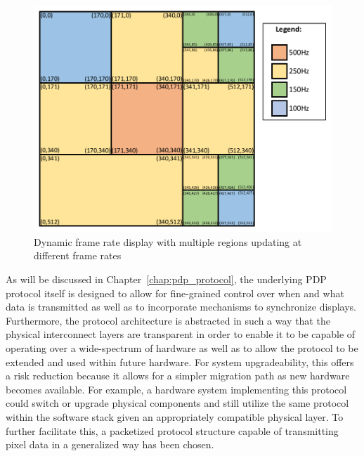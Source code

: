     \begin{figure}
        \centering
        \includegraphics[width=1.0\textwidth]{fig/variable_display.pdf}
        \caption{Dynamic frame rate display with multiple regions updating at different frame rates}
        \label{fig:variable_display}
    \end{figure}

    As will be discussed in Chapter~\ref{chap:pdp_protocol}, the underlying PDP protocol itself is designed to allow for fine-grained control over when and what data is transmitted as well as to incorporate mechanisms to synchronize displays. Furthermore, the protocol architecture is abstracted in such a way that the physical interconnect layers are transparent in order to enable it to be capable of operating over a wide-spectrum of hardware as well as to allow the protocol to be extended and used within future hardware. For system upgradeability, this offers a risk reduction because it allows for a simpler migration path as new hardware becomes available. For example, a hardware system implementing this protocol could switch or upgrade physical components and still utilize the same protocol within the software stack given an appropriately compatible physical layer. To further facilitate this, a packetized protocol structure capable of transmitting pixel data in a generalized way has been chosen.
